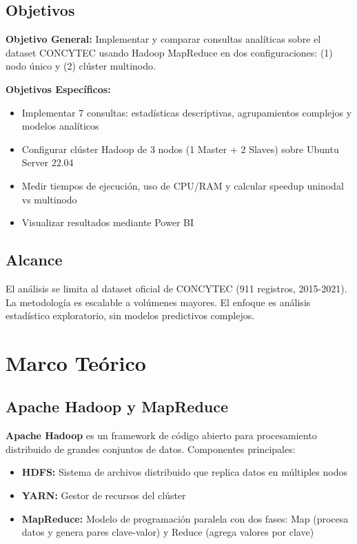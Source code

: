 \documentclass[12pt,a4paper]{article}
\begin{document}
\subsection{Objetivos}

\textbf{Objetivo General:} Implementar y comparar consultas analíticas sobre el dataset CONCYTEC usando Hadoop MapReduce en dos configuraciones: (1) nodo único y (2) clúster multinodo.

\textbf{Objetivos Específicos:}
\begin{itemize}
    \item Implementar 7 consultas: estadísticas descriptivas, agrupamientos complejos y modelos analíticos
    \item Configurar clúster Hadoop de 3 nodos (1 Master + 2 Slaves) sobre Ubuntu Server 22.04
    \item Medir tiempos de ejecución, uso de CPU/RAM y calcular speedup uninodal vs multinodo
    \item Visualizar resultados mediante Power BI
\end{itemize}

\subsection{Alcance}

El análisis se limita al dataset oficial de CONCYTEC (911 registros, 2015-2021). La metodología es escalable a volúmenes mayores. El enfoque es análisis estadístico exploratorio, sin modelos predictivos complejos.

\section{Marco Teórico}

\subsection{Apache Hadoop y MapReduce}

\textbf{Apache Hadoop} es un framework de código abierto para procesamiento distribuido de grandes conjuntos de datos. Componentes principales:

\begin{itemize}
    \item \textbf{HDFS:} Sistema de archivos distribuido que replica datos en múltiples nodos
    \item \textbf{YARN:} Gestor de recursos del clúster
    \item \textbf{MapReduce:} Modelo de programación paralela con dos fases: Map (procesa datos y genera pares clave-valor) y Reduce (agrega valores por clave)
\end{itemize}
\end{document}
